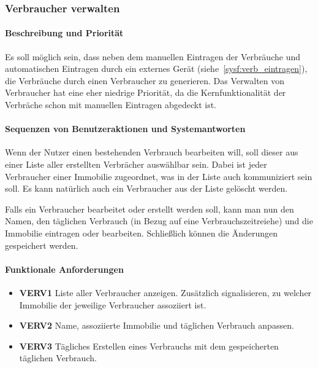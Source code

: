 
\subsubsection{Verbraucher verwalten}

\paragraph{Beschreibung und Priorität}
Es soll möglich sein, dass neben dem manuellen Eintragen der Verbräuche und automatischen Eintragen
durch ein externes Gerät (siehe~\ref{sysf:verb_eintragen}), die Verbräuche durch einen Verbraucher zu generieren.
Das Verwalten von Verbraucher hat eine eher niedrige Priorität, da die Kernfunktionalität der Verbräche schon
mit manuellen Eintragen abgedeckt ist.
\paragraph{Sequenzen von Benutzeraktionen und Systemantworten}
Wenn der Nutzer einen bestehenden Verbrauch bearbeiten will,
soll dieser aus einer Liste aller erstellten Verbrächer auswählbar sein.
Dabei ist jeder Verbraucher einer Immobilie zugeordnet, was in der Liste auch kommuniziert sein soll.
Es kann natürlich auch ein Verbraucher aus der Liste gelöscht werden.

Falls ein Verbraucher bearbeitet oder erstellt werden soll, kann man nun den Namen, den täglichen Verbrauch
(in Bezug auf eine Verbrauchszeitreiehe) und die Immobilie eintragen oder bearbeiten.
Schließlich können die Änderungen gespeichert werden.
\paragraph{Funktionale Anforderungen}
\begin{itemize}
	\item \textbf{VERV1} 	Liste aller Verbraucher anzeigen.
	      Zusätzlich signalisieren, zu welcher Immobilie der jeweilige Verbraucher assoziiert ist.
	\item \textbf{VERV2} 	Name, assoziierte Immobilie und täglichen Verbrauch anpassen.
	\item \textbf{VERV3} 	Tägliches Erstellen eines Verbrauchs mit dem gespeicherten täglichen Verbrauch.
\end{itemize}


